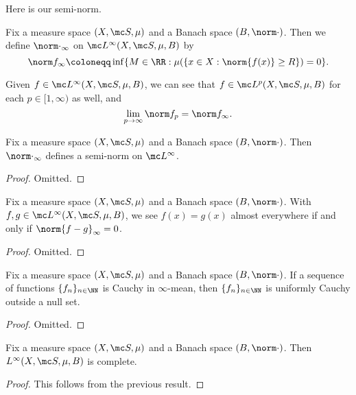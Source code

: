 \documentclass[../notes.tex]{subfiles}
\begin{document}
Here is our semi-norm.
\begin{notation}
	Fix a measure space $(X,\mc S,\mu)$ and a Banach space $(B,\norm\cdot)$. Then we define $\norm\cdot_\infty$ on $\mc L^\infty(X,\mc S,\mu,B)$ by
	\[\norm f_\infty\coloneqq\inf\{M\in\RR:\mu(\{x\in X:\norm{f(x)}\ge R\})=0\}.\]
\end{notation}
\begin{remark}
	Given $f\in\mc L^\infty(X,\mc S,\mu,B)$, we can see that $f\in\mc L^p(X,\mc S,\mu,B)$ for each $p\in[1,\infty)$ as well, and
	\[\lim_{p\to\infty}\norm f_p=\norm f_\infty.\]
\end{remark}
\begin{proposition}
	Fix a measure space $(X,\mc S,\mu)$ and a Banach space $(B,\norm\cdot)$. Then $\norm\cdot_\infty$ defines a semi-norm on $\mc L^\infty$.
\end{proposition}
\begin{proof}
	Omitted.
\end{proof}
\begin{proposition}
	Fix a measure space $(X,\mc S,\mu)$ and a Banach space $(B,\norm\cdot)$. With $f,g\in\mc L^\infty(X,\mc S,\mu,B)$, we see $f(x)=g(x)$ almost everywhere if and only if $\norm{f-g}_\infty=0$.
\end{proposition}
\begin{proof}
	Omitted.
\end{proof}
\begin{proposition}
	Fix a measure space $(X,\mc S,\mu)$ and a Banach space $(B,\norm\cdot)$. If a sequence of functions $\{f_n\}_{n\in\NN}$ is Cauchy in $\infty$-mean, then $\{f_n\}_{n\in\NN}$ is uniformly Cauchy outside a null set.
\end{proposition}
\begin{proof}
	Omitted.
\end{proof}
\begin{cor}
	Fix a measure space $(X,\mc S,\mu)$ and a Banach space $(B,\norm\cdot)$. Then $L^\infty(X,\mc S,\mu,B)$ is complete.
\end{cor}
\begin{proof}
	This follows from the previous result.
\end{proof}
\end{document}
